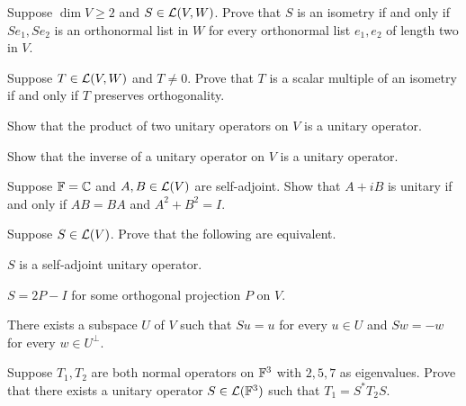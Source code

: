\begin{exc}

\begin{exercise}
Suppose $\dim V\ge2$ and $S\in\mathcal{L}(V,W)$. Prove that $S$ is an isometry if and
only if $Se_1,Se_2$ is an orthonormal list in $W$ for every orthonormal list
$e_1,e_2$ of length two in $V$.
\end{exercise}

\begin{exercise}
Suppose $T\in\mathcal{L}(V,W)$ and $T\ne0$. Prove that $T$ is a scalar multiple of an
isometry if and only if $T$ preserves orthogonality.
\end{exercise}

\begin{exercise}\leavevmode
\begin{parts}
\item Show that the product of two unitary operators on $V$ is a unitary
  operator.
\item Show that the inverse of a unitary operator on $V$ is a unitary operator.
\end{parts}
\end{exercise}

\begin{exercise}
Suppose $\mathbb{F}=\mathbb{C}$ and $A,B\in\mathcal{L}(V)$ are self-adjoint. Show that $A+iB$ is
unitary if and only if $AB=BA$ and $A^2+B^2=I$.
\end{exercise}

\begin{exercise}
Suppose $S\in\mathcal{L}(V)$. Prove that the following are equivalent.
\begin{parts}
\item $S$ is a self-adjoint unitary operator.
\item $S=2P-I$ for some orthogonal projection $P$ on $V$.
\item There exists a subspace $U$ of $V$ such that $Su=u$ for every $u\in U$
  and $Sw=-w$ for every $w\in U^\perp$.
\end{parts}
\end{exercise}

\begin{exercise}
Suppose $T_1,T_2$ are both normal operators on $\mathbb{F}^3$ with $2,5,7$ as
eigenvalues. Prove that there exists a unitary operator $S\in\mathcal{L}(\mathbb{F}^3)$ such
that $T_1=S^*T_2S$.
\end{exercise}


\end{exc}
